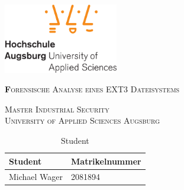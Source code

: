 \documentclass[
11pt,
liststotoc,
bibtotocnumbered,
headheight=34pt     %
]{scrartcl}             %
\begin{document}
	\begin{titlepage}
		\centering
		\includegraphics[width=5cm]{figures/hsa_logo-eps-converted-to.pdf}
		
		\vspace{1cm}
		{\scshape\LARGE\textbf Forensische Analyse eines EXT3 Dateisystems\par}
		\vspace{0.3cm}
		{\scshape\Large
			Master Industrial Security \\
			University of Applied Sciences Augsburg
			
			\par}
		\vspace{1cm}
		
		
		\vspace{8cm}
		
		\begin{table}[!htbp]
			\centering
			\caption{Student}
			\begin{tabular}{ll}
				\textbf{Student}			&	\textbf{Matrikelnummer}		\\
				\hline
				\hline
				Michael Wager	&	2081894			\\
			\end{tabular}
		\end{table}
		
		\date{\today}
	\end{titlepage}
	
	
	
	
	
\end{document}
